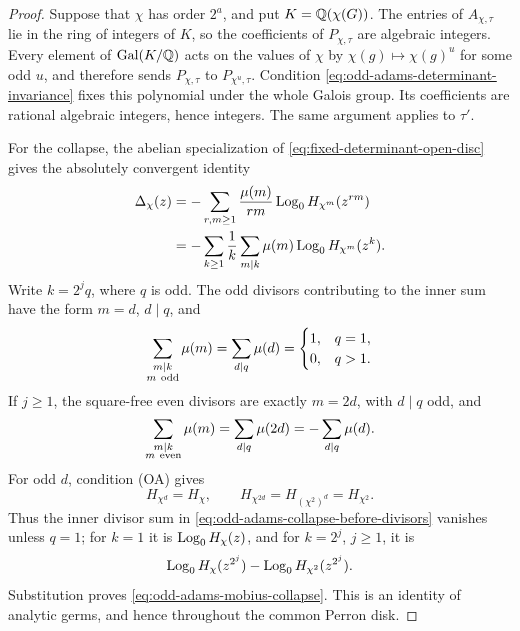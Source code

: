\begin{proof}
Suppose that \(\chi\) has order \(2^a\), and put
\(K=\mathbb{Q}(\chi(G))\).  The entries of \(A_{\chi,\tau}\) lie in the ring of
integers of \(K\), so the coefficients of \(P_{\chi,\tau}\) are algebraic
integers.  Every element of \(\operatorname{Gal}(K/\mathbb{Q})\) acts on the values
of \(\chi\) by \(\chi(g)\mapsto\chi(g)^u\) for some odd \(u\), and therefore
sends \(P_{\chi,\tau}\) to \(P_{\chi^u,\tau}\).  Condition
\eqref{eq:odd-adams-determinant-invariance} fixes this polynomial under the
whole Galois group.  Its coefficients are rational algebraic integers, hence
integers.  The same argument applies to \(\tau'\).

For the collapse, the abelian specialization of
\eqref{eq:fixed-determinant-open-disc} gives the absolutely convergent identity
\begin{align}
 \Delta_\chi(z)
 &=-\sum_{r,m\ge1}\frac{\mu(m)}{rm}
      \operatorname{Log}_0H_{\chi^m}(z^{rm})\notag\\
 &=-\sum_{k\ge1}\frac1k\sum_{m\mid k}\mu(m)
      \operatorname{Log}_0H_{\chi^m}(z^k).
 \label{eq:odd-adams-collapse-before-divisors}
\end{align}
Write \(k=2^jq\), where \(q\) is odd.  The odd divisors contributing to the
inner sum have the form \(m=d\), \(d\mid q\), and
\[
 \sum_{\substack{m\mid k\\m\ {\rm odd}}}\mu(m)
 =\sum_{d\mid q}\mu(d)
 =\begin{cases}1,&q=1,\\0,&q>1.\end{cases}
\]
If \(j\ge1\), the square-free even divisors are exactly \(m=2d\), with
\(d\mid q\) odd, and
\[
 \sum_{\substack{m\mid k\\m\ {\rm even}}}\mu(m)
 =\sum_{d\mid q}\mu(2d)
 =-\sum_{d\mid q}\mu(d).
\]
For odd \(d\), condition (OA) gives
\[
 H_{\chi^d}=H_\chi,\qquad
 H_{\chi^{2d}}=H_{(\chi^2)^d}=H_{\chi^2}.
\]
Thus the inner divisor sum in
\eqref{eq:odd-adams-collapse-before-divisors} vanishes unless \(q=1\);
for \(k=1\) it is \(\operatorname{Log}_0H_\chi(z)\), and for \(k=2^j\), \(j\ge1\), it is
\[
 \operatorname{Log}_0H_\chi(z^{2^j})-\operatorname{Log}_0H_{\chi^2}(z^{2^j}).
\]
Substitution proves \eqref{eq:odd-adams-mobius-collapse}.  This is an
identity of analytic germs, and hence throughout the common Perron disk.
\end{proof}

